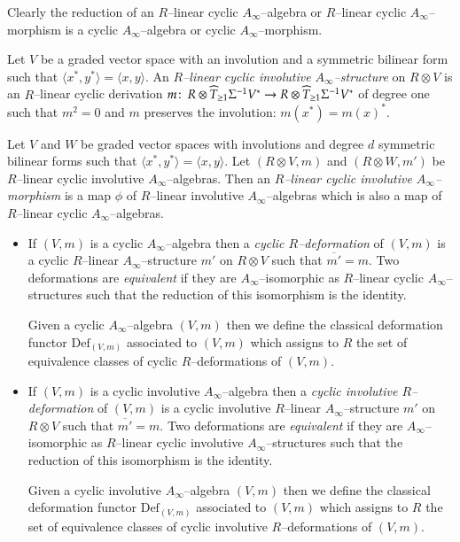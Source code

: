 \documentclass[british]{amsart}
\theoremstyle{plain}
\theoremstyle{definition}
{
\newaliascnt{{definition}}{theorem}\newtheorem{{definition}}[{definition}]{{Definition}}\aliascntresetthe{{definition}}\expandafterautorefname\endcsname{{Definition}}}
{
\newaliascnt{{remark}}{theorem}\newtheorem{{remark}}[{remark}]{{Remark}}\aliascntresetthe{{remark}}\expandafterautorefname\endcsname{{Remark}}}
{
\newaliascnt{{example}}{theorem}\newtheorem{{example}}[{example}]{{Example}}\aliascntresetthe{{example}}\expandafterautorefname\endcsname{{Example}}}
{
\newaliascnt{{examples}}{theorem}\newtheorem{{examples}}[{examples}]{{Examples}}\aliascntresetthe{{examples}}\expandafterautorefname\endcsname{{Examples}}}
{
\newaliascnt{{notation}}{theorem}\newtheorem{{notation}}[{notation}]{{Notation}}\aliascntresetthe{{notation}}\expandafterautorefname\endcsname{{Notation}}}
{
\newaliascnt{{convention}}{theorem}\newtheorem{{convention}}[{convention}]{{Convention}}\aliascntresetthe{{convention}}\expandafterautorefname\endcsname{{Convention}}}
\numberwithin{equation}{section}
\numberwithin{figure}{section}
\begin{document}
Clearly the reduction of an $R$--linear cyclic $A_\infty$--algebra or $R$--linear cyclic $A_\infty$--morphism is a cyclic $A_\infty$--algebra or cyclic $A_\infty$--morphism.

\begin{definition}
Let $V$ be a graded vector space with an involution and a symmetric bilinear form such that $\langle x^*, y^* \rangle = \langle x, y \rangle$. An \emph{$R$--linear cyclic involutive $A_\infty$--structure} on $R\otimes V$ is an $R$--linear cyclic derivation $m{\colon\thinspace} R \otimes \widehat{T}_{\geq 1}\Sigma^{-1}V^*\rightarrow R \otimes \widehat{T}_{\geq 1}\Sigma^{-1}V^*$ of degree one such that $m^2=0$ and $m$ preserves the involution: $m(x^*)=m(x)^*$.
\end{definition}

\begin{definition}
Let $V$ and $W$ be graded vector spaces with involutions and degree $d$ symmetric bilinear forms such that $\langle x^*, y^* \rangle = \langle x, y \rangle$. Let $(R\otimes V,m)$ and $(R\otimes W, m')$ be $R$--linear cyclic involutive $A_\infty$--algebras. Then an \emph{$R$--linear cyclic involutive $A_\infty$--morphism} is a map $\phi$ of $R$--linear involutive $A_\infty$--algebras which is also a map of $R$--linear cyclic $A_\infty$--algebras.
\end{definition}

\begin{definition}
\mbox{}
\begin{itemize}
\item If $(V,m)$ is a cyclic $A_\infty$--algebra then a \emph{cyclic $R$--deformation} of $(V,m)$ is a cyclic $R$--linear $A_\infty$--structure $m'$ on $R\otimes V$ such that ${\overline{{m'}}}=m$. Two deformations are \emph{equivalent} if they are $A_\infty$--isomorphic as $R$--linear cyclic $A_\infty$--structures such that the reduction of this isomorphism is the identity.

Given a cyclic $A_\infty$--algebra $(V,m)$ then we define the classical deformation functor ${\mathrm{Def}}_{(V,m)}$ associated to $(V,m)$ which assigns to $R$ the set of equivalence classes of cyclic $R$--deformations of $(V,m)$.
\item If $(V,m)$ is a cyclic involutive $A_\infty$--algebra then a \emph{cyclic involutive $R$--deformation} of $(V,m)$ is a cyclic involutive $R$--linear $A_\infty$--structure $m'$ on $R\otimes V$ such that ${\overline{{m'}}}=m$. Two deformations are \emph{equivalent} if they are $A_\infty$--isomorphic as $R$--linear cyclic involutive $A_\infty$--structures such that the reduction of this isomorphism is the identity.

Given a cyclic involutive $A_\infty$--algebra $(V,m)$ then we define the classical deformation functor ${\mathrm{Def}}_{(V,m)}$ associated to $(V,m)$ which assigns to $R$ the set of equivalence classes of cyclic involutive $R$--deformations of $(V,m)$.
\end{itemize}
\end{definition}
\end{document}
